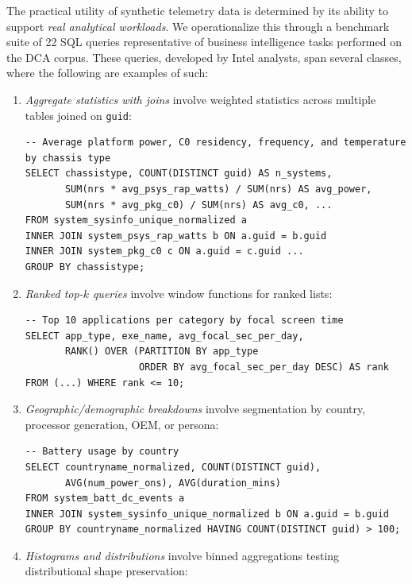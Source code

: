 \documentclass[12pt,letterpaper]{article}
\renewcommand{\_}{\textunderscore\allowbreak}
\begin{document}
\newpage

The practical utility of synthetic telemetry data is determined by its ability to support \textit{real analytical workloads}. We operationalize this through a benchmark suite of 22 SQL queries representative of business intelligence tasks performed on the DCA corpus. These queries, developed by Intel analysts, span several classes, where the following are examples of such:

\begin{enumerate}
    \item \textit{Aggregate statistics with joins} involve weighted statistics across multiple tables joined on \texttt{guid}:

\begin{verbatim}
-- Average platform power, C0 residency, frequency, and temperature by chassis type
SELECT chassistype, COUNT(DISTINCT guid) AS n_systems,
       SUM(nrs * avg_psys_rap_watts) / SUM(nrs) AS avg_power,
       SUM(nrs * avg_pkg_c0) / SUM(nrs) AS avg_c0, ...
FROM system_sysinfo_unique_normalized a
INNER JOIN system_psys_rap_watts b ON a.guid = b.guid
INNER JOIN system_pkg_c0 c ON a.guid = c.guid ...
GROUP BY chassistype;
\end{verbatim}

    \item \textit{Ranked top-$k$ queries} involve window functions for ranked lists:
\begin{verbatim}
-- Top 10 applications per category by focal screen time
SELECT app_type, exe_name, avg_focal_sec_per_day,
       RANK() OVER (PARTITION BY app_type 
                    ORDER BY avg_focal_sec_per_day DESC) AS rank
FROM (...) WHERE rank <= 10;
\end{verbatim}

    \item \textit{Geographic/demographic breakdowns} involve segmentation by country, processor generation, OEM, or persona:

\begin{verbatim}
-- Battery usage by country
SELECT countryname_normalized, COUNT(DISTINCT guid),
       AVG(num_power_ons), AVG(duration_mins)
FROM system_batt_dc_events a
INNER JOIN system_sysinfo_unique_normalized b ON a.guid = b.guid
GROUP BY countryname_normalized HAVING COUNT(DISTINCT guid) > 100;
\end{verbatim}

    \item \textit{Histograms and distributions} involve binned aggregations testing distributional shape preservation:


\end{enumerate}
\end{document}
